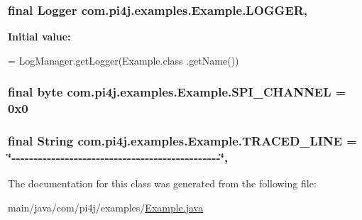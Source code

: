 \subsubsection[{L\+O\+G\+G\+E\+R}]{\setlength{\rightskip}{0pt plus 5cm}final Logger com.\+pi4j.\+examples.\+Example.\+L\+O\+G\+G\+E\+R\hspace{0.3cm}{\ttfamily [static]}, {\ttfamily [private]}}\label{classcom_1_1pi4j_1_1examples_1_1Example_ae8e218a8535d844b1b928cfc835a30ba}
{\bfseries Initial value\+:}
\begin{DoxyCode}
= LogManager.getLogger(Example.class
            .getName())
\end{DoxyCode}
\hypertarget{classcom_1_1pi4j_1_1examples_1_1Example_a467713cca966503adb0e98f963ca894e}{}
\subsubsection[{S\+P\+I\+\_\+\+C\+H\+A\+N\+N\+E\+L}]{\setlength{\rightskip}{0pt plus 5cm}final byte com.\+pi4j.\+examples.\+Example.\+S\+P\+I\+\_\+\+C\+H\+A\+N\+N\+E\+L = 0x0\hspace{0.3cm}{\ttfamily [static]}}\label{classcom_1_1pi4j_1_1examples_1_1Example_a467713cca966503adb0e98f963ca894e}
\hypertarget{classcom_1_1pi4j_1_1examples_1_1Example_aebff74f082fb0684ef3c7cd361ea0480}{}
\subsubsection[{T\+R\+A\+C\+E\+D\+\_\+\+L\+I\+N\+E}]{\setlength{\rightskip}{0pt plus 5cm}final String com.\+pi4j.\+examples.\+Example.\+T\+R\+A\+C\+E\+D\+\_\+\+L\+I\+N\+E = \char`\"{}-\/-\/-\/-\/-\/-\/-\/-\/-\/-\/-\/-\/-\/-\/-\/-\/-\/-\/-\/-\/-\/-\/-\/-\/-\/-\/-\/-\/-\/-\/-\/-\/-\/-\/-\/-\/-\/-\/-\/-\/-\/-\/-\/-\/-\/-\/-\/\char`\"{}\hspace{0.3cm}{\ttfamily [static]}, {\ttfamily [private]}}\label{classcom_1_1pi4j_1_1examples_1_1Example_aebff74f082fb0684ef3c7cd361ea0480}


The documentation for this class was generated from the following file\+:\begin{DoxyCompactItemize}
\item 
main/java/com/pi4j/examples/\hyperlink{Example_8java}{Example.\+java}\end{DoxyCompactItemize}
